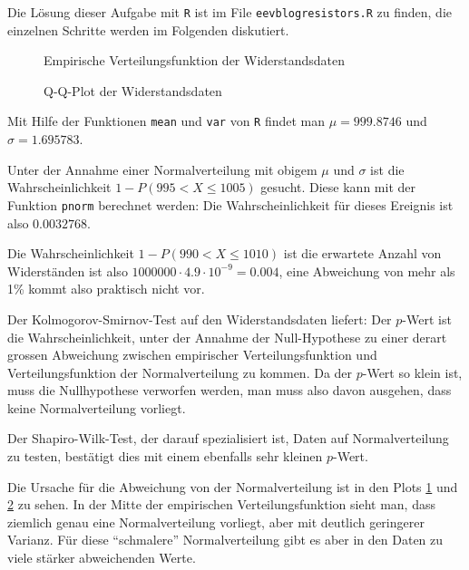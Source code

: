 \begin{loesung}
Die Lösung dieser Aufgabe mit {\tt R} ist im File {\tt eevblogresistors.R}
zu finden, die einzelnen Schritte werden im Folgenden diskutiert.
\begin{figure}
\begin{center}
\end{center}
\caption{Empirische Verteilungsfunktion der Widerstandsdaten\label{80000020-ecdf}}
\end{figure}
\begin{figure}
\begin{center}
\end{center}
\caption{Q-Q-Plot der Widerstandsdaten\label{80000020-qq}}
\end{figure}
\begin{teilaufgaben}
\item
Mit Hilfe der Funktionen {\tt mean} und {\tt var} von {\tt R} findet man
$\mu= 999.8746$ und $\sigma= 1.695783$.
\item
Unter der Annahme einer Normalverteilung mit obigem $\mu$ und $\sigma$
ist die Wahrscheinlichkeit
$1-P(995 < X \le 1005)$ gesucht.
Diese kann mit der Funktion {\tt pnorm} berechnet werden:
Die Wahrscheinlichkeit für dieses Ereignis ist also $0.0032768$.
\item
Die Wahrscheinlichkeit $1-P(990 < X \le 1010)$ ist 
die erwartete Anzahl von Widerständen ist also
$1000000 \cdot 4.9\cdot 10^{-9}=0.004$, eine Abweichung von mehr als 1\%
kommt also praktisch nicht vor.
\item
Der Kolmogorov-Smirnov-Test auf den Widerstandsdaten liefert:
{\small
{}
}
Der $p$-Wert ist die Wahrscheinlichkeit, unter der Annahme der Null-Hypothese
zu einer derart grossen Abweichung zwischen empirischer Verteilungsfunktion
und Verteilungsfunktion der Normalverteilung zu kommen. Da der $p$-Wert
so klein ist, muss die Nullhypothese verworfen werden, man muss also davon
ausgehen, dass keine Normalverteilung vorliegt.

Der Shapiro-Wilk-Test, der darauf spezialisiert ist, Daten auf Normalverteilung
zu testen, bestätigt dies mit einem ebenfalls sehr kleinen $p$-Wert.

Die Ursache für die Abweichung von der Normalverteilung ist in den Plots
\ref{80000020-ecdf} und \ref{80000020-qq} zu
sehen. In der Mitte der empirischen Verteilungsfunktion sieht man, dass
ziemlich genau eine Normalverteilung vorliegt, aber mit deutlich
geringerer Varianz.
Für diese ``schmalere'' Normalverteilung gibt es aber in den Daten
zu viele stärker abweichenden Werte.
\end{teilaufgaben}
\end{loesung}

